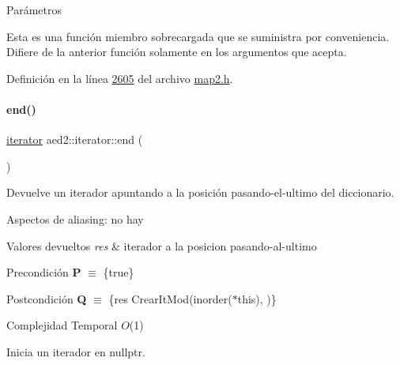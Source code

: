 \begin{DoxyParams}{\-Parámetros}
\begin{DoxyCompactItemize}
Esta es una función miembro sobrecargada que se suministra por conveniencia. Difiere de la anterior función solamente en los argumentos que acepta. 

Definición en la línea \hyperlink{map2_8h_source_l02605}{2605} del archivo \hyperlink{map2_8h_source}{map2.\+h}.

\mbox{\label{classaed2_1_1iterator_a67caf9468be999e9be96b7add5d79946_a67caf9468be999e9be96b7add5d79946}} 
\paragraph{\texorpdfstring{end()}{end()}\hspace{0.1cm}{\footnotesize\ttfamily [1/2]}}
{\footnotesize\ttfamily \hyperlink{classaed2_1_1iterator_1_1iterator}{iterator} aed2\+::iterator\+::end (\begin{DoxyParamCaption}{ }\end{DoxyParamCaption})\hspace{0.3cm}{\ttfamily [inline]}}



Devuelve un iterador apuntando a la posición pasando-\/el-\/ultimo del diccionario. 

\begin{DoxyParagraph}{Aspectos de aliasing\+:}
no hay
\end{DoxyParagraph}

\begin{DoxyRetVals}{Valores devueltos}
{\em res} & iterador a la posicion pasando-\/al-\/ultimo\\
\hline
\end{DoxyRetVals}
\begin{DoxyPrecond}{Precondición}
{\bfseries P} $\equiv$ \{true\} 
\end{DoxyPrecond}
\begin{DoxyPostcond}{Postcondición}
{\bfseries Q} $\equiv$ \{res  Crear\+It\+Mod(inorder($\ast$this),  )\}
\end{DoxyPostcond}

\begin{DoxyDescription}
\item[Complejidad Temporal]$O$(1)
\end{DoxyDescription}

Inicia un iterador en nullptr. 


\end{DoxyCompactItemize}
\end{DoxyParams}
